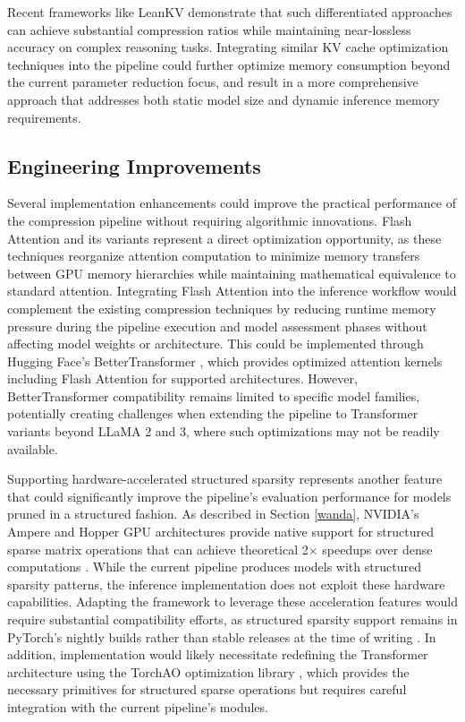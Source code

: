 Recent frameworks like LeanKV \cite{kvcompr2} demonstrate that such differentiated approaches can achieve substantial compression ratios while maintaining near-lossless accuracy on complex reasoning tasks. Integrating similar KV cache optimization techniques into the pipeline could further optimize memory consumption beyond the current parameter reduction focus, and result in a more comprehensive approach that addresses both static model size and dynamic inference memory requirements.

\subsection{Engineering Improvements} \label{sec:future_work_engineering}
Several implementation enhancements could improve the practical performance of the compression pipeline without requiring algorithmic innovations. Flash Attention \cite{flash_attention} and its variants represent a direct optimization opportunity, as these techniques reorganize attention computation to minimize memory transfers between GPU memory hierarchies while maintaining mathematical equivalence to standard attention. Integrating Flash Attention into the inference workflow would complement the existing compression techniques by reducing runtime memory pressure during the pipeline execution and model assessment phases without affecting model weights or architecture. This could be implemented through Hugging Face's BetterTransformer \cite{bettertransformer}, which provides optimized attention kernels including Flash Attention for supported architectures. However, BetterTransformer compatibility remains limited to specific model families, potentially creating challenges when extending the pipeline to Transformer variants beyond LLaMA 2 and 3, where such optimizations may not be readily available.

Supporting hardware-accelerated structured sparsity represents another feature that could significantly improve the pipeline's evaluation performance for models pruned in a structured fashion. As described in Section \ref{wanda}, NVIDIA's Ampere and Hopper GPU architectures provide native support for structured sparse matrix operations that can achieve theoretical 2$\times$ speedups over dense computations \cite{nvidia-width}. While the current pipeline produces models with structured sparsity patterns, the inference implementation does not exploit these hardware capabilities. Adapting the framework to leverage these acceleration features would require substantial compatibility efforts, as structured sparsity support remains in PyTorch's nightly builds rather than stable releases at the time of writing \cite{pytorch_sparsity}. In addition, implementation would likely necessitate redefining the Transformer architecture using the TorchAO optimization library \cite{torchao}, which provides the necessary primitives for structured sparse operations but requires careful integration with the current pipeline's modules.

